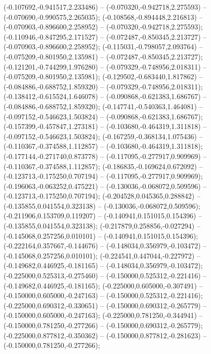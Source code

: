 (-0.107692,-0.941517,2.233486) -- (-0.070320,-0.942718,2.275593) -- (-0.070690,-0.990575,2.265035);
 (-0.108568,-0.894448,2.216813) -- (-0.070903,-0.896600,2.258952) -- (-0.070320,-0.942718,2.275593);
 (-0.110946,-0.847295,2.171527) -- (-0.072487,-0.850345,2.213727) -- (-0.070903,-0.896600,2.258952);
 (-0.115031,-0.798057,2.093764) -- (-0.075209,-0.801950,2.135981) -- (-0.072487,-0.850345,2.213727);
 (-0.121201,-0.744299,1.976280) -- (-0.079329,-0.748956,2.018311) -- (-0.075209,-0.801950,2.135981);
 (-0.129502,-0.683440,1.817862) -- (-0.084886,-0.688752,1.859320) -- (-0.079329,-0.748956,2.018311);
 (-0.138412,-0.615524,1.646078) -- (-0.090868,-0.621383,1.686767) -- (-0.084886,-0.688752,1.859320);
 (-0.147741,-0.540363,1.464081) -- (-0.097152,-0.546623,1.503824) -- (-0.090868,-0.621383,1.686767);
 (-0.157399,-0.457847,1.273181) -- (-0.103680,-0.464319,1.311818) -- (-0.097152,-0.546623,1.503824);
 (-0.167259,-0.368134,1.075436) -- (-0.110367,-0.374588,1.112857) -- (-0.103680,-0.464319,1.311818);
 (-0.177144,-0.271740,0.873778) -- (-0.117095,-0.277917,0.909969) -- (-0.110367,-0.374588,1.112857);
 (-0.186835,-0.169624,0.672092) -- (-0.123713,-0.175250,0.707194) -- (-0.117095,-0.277917,0.909969);
 (-0.196063,-0.063252,0.475221) -- (-0.130036,-0.068072,0.509596) -- (-0.123713,-0.175250,0.707194);
 (-0.204528,0.045365,0.288842) -- (-0.135855,0.041554,0.323138) -- (-0.130036,-0.068072,0.509596);
 (-0.211906,0.153709,0.119207) -- (-0.140941,0.151015,0.154396) -- (-0.135855,0.041554,0.323138);
 (-0.217879,0.258856,-0.027294) -- (-0.145068,0.257256,0.010101) -- (-0.140941,0.151015,0.154396);
 (-0.222164,0.357667,-0.144676) -- (-0.148034,0.356979,-0.103472) -- (-0.145068,0.257256,0.010101);
 (-0.224541,0.447044,-0.227972) -- (-0.149682,0.446925,-0.181165) -- (-0.148034,0.356979,-0.103472);
 (-0.225000,0.525313,-0.275460) -- (-0.150000,0.525312,-0.221416) -- (-0.149682,0.446925,-0.181165);
 (-0.225000,0.605000,-0.307491) -- (-0.150000,0.605000,-0.247163) -- (-0.150000,0.525312,-0.221416);
 (-0.225000,0.690312,-0.330651) -- (-0.150000,0.690312,-0.265779) -- (-0.150000,0.605000,-0.247163);
 (-0.225000,0.781250,-0.344941) -- (-0.150000,0.781250,-0.277266) -- (-0.150000,0.690312,-0.265779);
 (-0.225000,0.877812,-0.350362) -- (-0.150000,0.877812,-0.281623) -- (-0.150000,0.781250,-0.277266);
